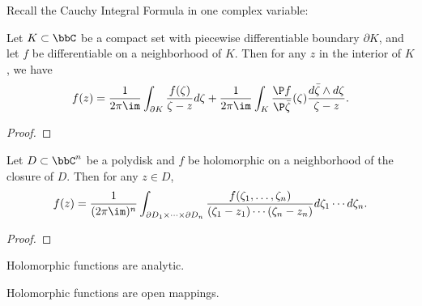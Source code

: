     Recall the Cauchy Integral Formula in one complex variable:

    \begin{theorem}\label{thm:Cauchy_Integral_Formula_in_one_complex_variable}
        Let \(K \subset \bbC\) be a compact set with piecewise differentiable boundary \(\partial K\), and let \(f\) be differentiable on a neighborhood of \(K\). 
        Then for any \(z\) in the interior of \(K\), we have 
        \[ f(z) = \frac{1}{2\pi \im } \int_{\partial K} \frac{f(\zeta)}{\zeta - z} d\zeta + \frac{1}{2\pi \im} \int_K \frac{\P f}{\P \bar{\zeta}}(\zeta) \frac{d\bar{\zeta} \wedge d\zeta}{\zeta - z}. \]
    \end{theorem}
    \begin{proof}
    \end{proof}

    \begin{theorem}\label{thm:Cauchy_Integral_Formula_in_several_complex_variables}
        Let \(D \subset \bbC^n\) be a polydisk and \(f\) be holomorphic on a neighborhood of the closure of \(D\). 
        Then for any \(z \in D\),
        \[ f(z) = \frac{1}{(2\pi \im)^n} \int_{\partial D_1 \times \cdots \times \partial D_n} \frac{f(\zeta_1, \ldots, \zeta_n)}{(\zeta_1 - z_1) \cdots (\zeta_n - z_n)} d\zeta_1 \cdots d\zeta_n. \]
    \end{theorem}
    \begin{proof}
    \end{proof}

    \begin{corollary}\label{cor:holomorphic_functions_are_analytic}
        Holomorphic functions are analytic.
    \end{corollary}

    \begin{proposition}\label{prop:open_mapping_theorem}
        Holomorphic functions are open mappings.
    \end{proposition}

